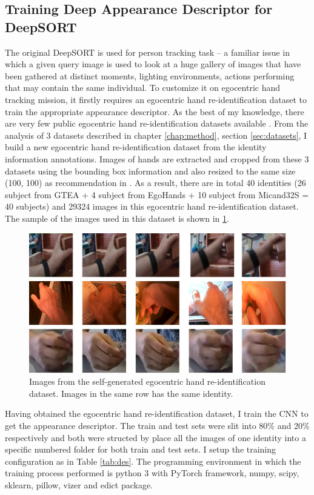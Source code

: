 \subsection{Training Deep Appearance Descriptor for DeepSORT}
The original DeepSORT is used for person tracking task – a familiar issue in which a given query image is used to look at a huge gallery of images that have been gathered at distinct moments, lighting environments, actions performing that may contain the same individual. To customize it on egocentric hand tracking mission, it firstly requires an egocentric hand re-identification dataset to train the appropriate appearance descriptor. As the best of my knowledge, there are very few public egocentric hand re-identification datasets available \cite{9064606}. From the analysis of 3 datasets described in chapter \ref{chap:method}, section \ref{sec:datasets}, I build a new egocentric hand re-identification dataset from the identity information annotations. Images of hands are extracted and cropped from these 3 datasets using the bounding box information and also resized to the same size (100, 100) as recommendation in  \cite{DBLP:journals/corr/abs-1812-00442}. As a result, there are in total 40 identities (26 subject from GTEA + 4 subject from EgoHands + 10 subject from Micand32S = 40 subjects) and 29324 images in this egocentric hand re-identification dataset. The sample of the images used in this dataset is shown in \ref{fig:reid}.
\begin{figure}
	\centerline{\includegraphics[width=1\linewidth]{Figs/reid.png}}
	\caption{Images from the self-generated egocentric hand re-identification dataset. Images in the same row has the same identity.}
	\label{fig:reid}
\end{figure}
Having obtained the egocentric hand re-identification dataset, I train the CNN to get the appearance descriptor. The train and test sets were slit into 80\% and 20\% respectively and both were structed by place all the images of one identity into a specific numbered folder for both train and test sets. I setup the training configuration as in Table \ref{tab:des}. The programming environment in which the training process performed is python 3 with PyTorch framework, numpy, scipy, sklearn, pillow, vizer and edict package.
